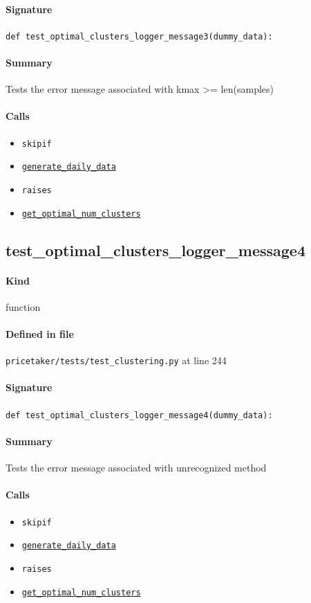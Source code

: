 \documentclass[11pt]{report}
\begin{document}
\paragraph{Signature} \texttt{def test\_optimal\_clusters\_logger\_message3(dummy\_data):}
\paragraph{Summary} Tests the error message associated with kmax >= len(samples)
\paragraph{Calls}
\begin{itemize}[leftmargin=*]
  \item \texttt{skipif}
  \item \hyperref[def:pricetaker-clustering.py:generate_daily_data:L35]{\texttt{generate\_daily\_data}}
  \item \texttt{raises}
  \item \hyperref[def:pricetaker-clustering.py:get_optimal_num_clusters:L142]{\texttt{get\_optimal\_num\_clusters}}
\end{itemize}
\subsection{test\_optimal\_clusters\_logger\_message4}
\label{def:pricetaker-tests-test_clustering.py:test_optimal_clusters_logger_message4:L244}
\paragraph{Kind} function
\paragraph{Defined in file} \texttt{pricetaker/tests/test\_clustering.py} at line 244
\paragraph{Signature} \texttt{def test\_optimal\_clusters\_logger\_message4(dummy\_data):}
\paragraph{Summary} Tests the error message associated with unrecognized method
\paragraph{Calls}
\begin{itemize}[leftmargin=*]
  \item \texttt{skipif}
  \item \hyperref[def:pricetaker-clustering.py:generate_daily_data:L35]{\texttt{generate\_daily\_data}}
  \item \texttt{raises}
  \item \hyperref[def:pricetaker-clustering.py:get_optimal_num_clusters:L142]{\texttt{get\_optimal\_num\_clusters}}
\end{itemize}
\end{document}
